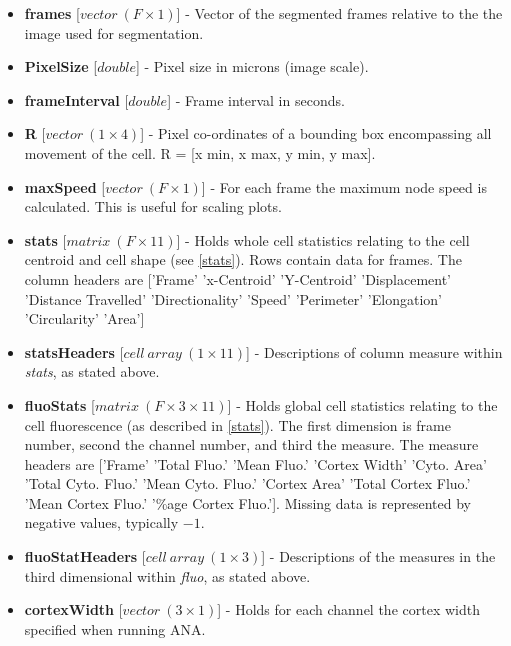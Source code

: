 \documentclass[a4paper,12pt]{article}
\begin{document}
\begin{itemize}
 \item \textbf{frames} [$vector~(F\times1)$] - Vector of the segmented frames relative to the the image used for segmentation.
 
  \item \textbf{PixelSize} [$double$] - Pixel size in microns (image scale).

 \item \textbf{frameInterval} [$double$] - Frame interval in seconds.
  
 \item \textbf{R} [$vector~(1\times4)$] - Pixel co-ordinates of a bounding box encompassing all movement of the cell.
 R = [x min, x max, y min, y max]. 
 
  \item \textbf{maxSpeed} [$vector~(F\times1)$] - For each frame the maximum node speed is calculated.
  This is useful for scaling plots.

 \item \textbf{stats} [$matrix~(F\times11)$] - Holds whole cell statistics relating to the cell centroid and cell shape (see
 \autoref{stats}).  Rows contain data for frames.  The column headers are ['Frame'    'x-Centroid'    'Y-Centroid' 
 'Displacement'   'Distance Travelled'    'Directionality'  'Speed'    'Perimeter'    'Elongation'    'Circularity'    'Area']

  \item \textbf{statsHeaders} [$cell~array~(1\times11)$] - Descriptions of column measure within \textit{stats}, as stated above.
  
  \item \textbf{fluoStats} [$matrix~(F\times3\times11)$] - Holds global cell statistics relating to the cell fluorescence (as described in
 \autoref{stats}).  The first dimension is frame number,  second the channel number, and third the measure.  The 
 measure headers are ['Frame'    'Total Fluo.'    'Mean Fluo.'    'Cortex Width'    'Cyto. Area'    'Total Cyto. Fluo.'
  'Mean Cyto. Fluo.'    'Cortex Area'    'Total Cortex Fluo.'    'Mean Cortex Fluo.'    '\%age Cortex Fluo.'].  Missing data is represented
  by negative values, typically $-1$.
  
  \item \textbf{fluoStatHeaders} [$cell~array~(1\times3)$] - Descriptions of the measures in the third dimensional
  within \textit{fluo}, as stated above.
  
  \item \textbf{cortexWidth} [$vector~(3\times1)$] - Holds for each channel the cortex width specified when running ANA. 
  

\end{itemize}
\end{document}
